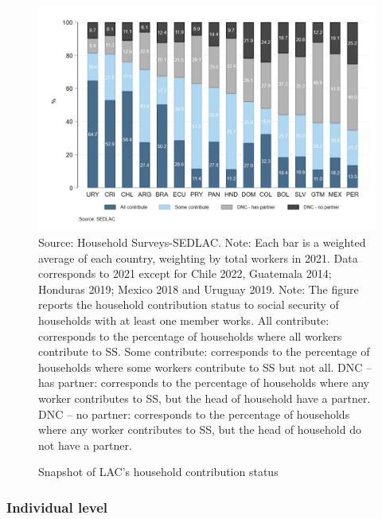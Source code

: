\documentclass[english]{article}
\begin{document}
\begin{itemize}
\begin{figure}[!htb]
    \justifying
     \caption{Snapshot of LAC’s household contribution status}     \includegraphics[scale=.3]{latex/figures/Household/snapshot_household.png}
    \label{fig:Householdlastyear}
    \footnotesize{Source: Household Surveys-SEDLAC.}
    \footnotesize{Note: Each bar is a weighted average of each country, weighting by total workers in 2021. Data corresponds to 2021 except for Chile 2022, Guatemala 2014; Honduras 2019; Mexico 2018 and Uruguay 2019.}
    \footnotesize{Note: The figure reports the household contribution status to social security of households with at least one member works.   All contribute: corresponds to the percentage of households where all workers contribute to SS. Some contribute: corresponds to the percentage of households where some workers contribute to SS but not all. DNC – has partner: corresponds to the percentage of households where any worker contributes to SS, but the head of household have a partner. DNC – no partner: corresponds to the percentage of households where any worker contributes to SS, but the head of household do not have a partner.}
\end{figure}

\subsubsection{Individual level} %


\end{itemize}
\end{document}
